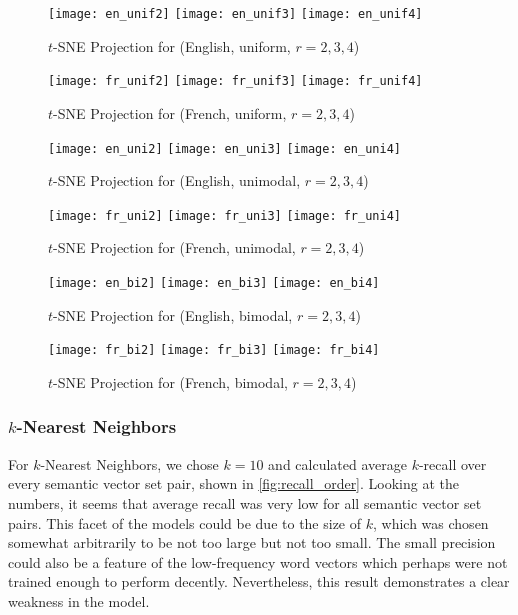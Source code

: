 \documentclass[12pt, usenames]{article}
\theoremstyle{definition}
\theoremstyle{definition}
\theoremstyle{definition}
\begin{document}
\begin{figure}
\texttt{[image: en\_unif2]}
\texttt{[image: en\_unif3]}
\texttt{[image: en\_unif4]}
\centering
\caption{$t$-SNE Projection for (English, uniform, $r = 2, 3, 4$)}
\label{fig:en_unif}
\end{figure}
\begin{figure}
\texttt{[image: fr\_unif2]}
\texttt{[image: fr\_unif3]}
\texttt{[image: fr\_unif4]}
\centering
\caption{$t$-SNE Projection for (French, uniform, $r = 2, 3, 4$)}
\label{fig:fr_unif}
\end{figure}
\begin{figure}
\texttt{[image: en\_uni2]}
\texttt{[image: en\_uni3]}
\texttt{[image: en\_uni4]}
\centering
\caption{$t$-SNE Projection for (English, unimodal, $r = 2, 3, 4$)}
\label{fig:en_uni}
\end{figure}
\begin{figure}
\texttt{[image: fr\_uni2]}
\texttt{[image: fr\_uni3]}
\texttt{[image: fr\_uni4]}
\centering
\caption{$t$-SNE Projection for (French, unimodal, $r = 2, 3, 4$)}
\label{fig:fr_uni}
\end{figure}
\begin{figure}
\texttt{[image: en\_bi2]}
\texttt{[image: en\_bi3]}
\texttt{[image: en\_bi4]}
\centering
\caption{$t$-SNE Projection for (English, bimodal, $r = 2, 3, 4$)}
\label{fig:en_bi}
\end{figure}
\begin{figure}
\texttt{[image: fr\_bi2]}
\texttt{[image: fr\_bi3]}
\texttt{[image: fr\_bi4]}
\centering
\caption{$t$-SNE Projection for (French, bimodal, $r = 2, 3, 4$)}
\label{fig:fr_bi}
\end{figure}

\FloatBarrier
\subsubsection{$k$-Nearest Neighbors}

For $k$-Nearest Neighbors, we chose $k = 10$ and calculated average $k$-recall over every semantic vector set pair, shown in \autoref{fig:recall_order}. Looking at the numbers, it seems that average recall was very low for all semantic vector set pairs. This facet of the models could be due to the size of $k$, which was chosen somewhat arbitrarily to be not too large but not too small. The small precision could also be a feature of the low-frequency word vectors which perhaps were not trained enough to perform decently. Nevertheless, this result demonstrates a clear weakness in the model. 
\end{document}
